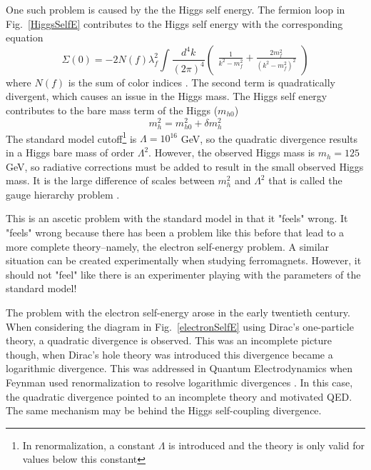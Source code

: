 One such problem is caused by the the Higgs self energy. The fermion loop in Fig.~\ref{HiggsSelfE} contributes to the Higgs self energy with the corresponding equation
\begin{equation}
    \Sigma (0) = -2 N(f)\lambda_{f}^{2}\int \frac{d^{4}k}{(2\pi)^{4}} 
    \begin{pmatrix}
    \frac{1}{k^{2}-m_{f}^{2}} + \frac{2m_{f}^{2}}{(k^{2}-m_{f}^{2})^{2}}
    \end{pmatrix}
\end{equation}
where $N(f)$ is the sum of color indices \cite{SusyHiggsSelfE}. The second term is quadratically divergent, which causes an issue in the Higgs mass. The Higgs self energy contributes to the bare mass term of the Higgs ($m_{h0}$)
\begin{equation}
    m_{h}^{2}=m_{h0}^{2} + \delta m_{h}^{2}
\end{equation}
The standard model cutoff\footnote{In renormalization, a constant $\Lambda$ is introduced and the theory is only valid for values below this constant} is $\Lambda=10^{16}$ GeV, so the quadratic divergence results in a Higgs bare mass of order $\Lambda^{2}$. However, the observed Higgs mass is $m_{h}=125$ GeV, so radiative corrections must be added to result in the small observed Higgs mass. It is the large difference of scales between $m_{h}^{2}$ and $\Lambda^{2}$ that is called the gauge hierarchy problem \cite{Peskin}.

This is an ascetic problem with the standard model in that it "feels" wrong. It "feels" wrong because there has been a problem like this before that lead to a more complete theory--namely, the electron self-energy problem. A similar situation can be created experimentally when studying ferromagnets. However, it should not "feel" like there is an experimenter playing with the parameters of the standard model!

The problem with the electron self-energy arose in the early twentieth century. When considering the diagram in Fig.~\ref{electronSelfE} using Dirac's one-particle theory, a quadratic divergence is observed. This was an incomplete picture though, when Dirac's hole theory was introduced this divergence became a logarithmic divergence. This was addressed in Quantum Electrodynamics when Feynman used renormalization to resolve logarithmic divergences \cite{electronSelfE}. In this case, the quadratic divergence pointed to an incomplete theory and motivated QED. The same mechanism may be behind the Higgs self-coupling divergence.

